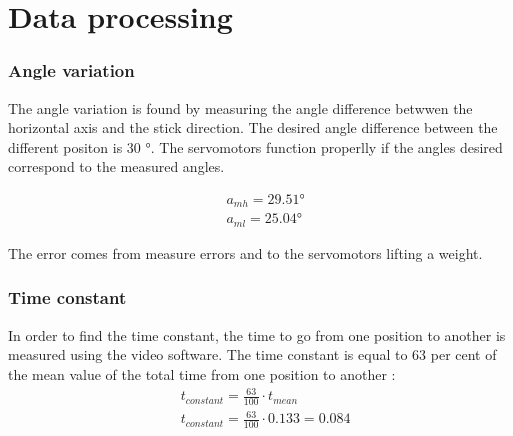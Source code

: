 	\section*{Data processing}	
	
		\subsubsection*{Angle variation}
		
The angle variation is found by measuring the angle difference betwwen the horizontal axis and the stick direction. The desired angle difference between the different positon is $30$ \si{\degree}. The servomotors function properlly if the angles desired correspond to the measured angles.

\begin{subequations}
	\begin{flalign}
		& a_{mh} = 29.51 \si{\degree} \\  
		& a_{ml} = 25.04 \si{\degree}
	\end{flalign}
\end{subequations}
\startexplain
{}
\stopexplain

The error comes from measure errors and to the servomotors lifting a weight.

		\subsubsection*{Time constant}
		
 In order to find the time constant, the time to go from one position to another is measured using the video software. The time constant is equal to $63$ per cent of the mean value of the total time from one position to another : 
 \begin{subequations}
 	\begin{flalign}
 		& t_{constant} = \frac{63}{100} \cdot t_{mean} \\
 		& t_{constant} = \frac{63}{100} \cdot 0.133 = 0.084
 		\label{eq:TfC1C2}
 	\end{flalign}
 \end{subequations}
 \startexplain
{}
\stopexplain
 
